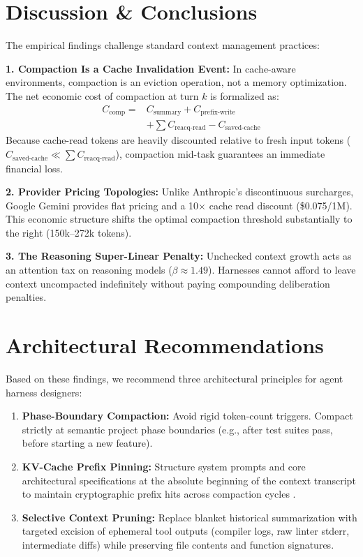 \documentclass[10pt,twocolumn,a4paper]{article}
\begin{document}
\section{Discussion \& Conclusions}

The empirical findings challenge standard context management practices:

\textbf{1. Compaction Is a Cache Invalidation Event:} In cache-aware environments, compaction is an eviction operation, not a memory optimization. The net economic cost of compaction at turn $k$ is formalized as:
\begin{align}
C_{\text{comp}} ={} & C_{\text{summary}} + C_{\text{prefix-write}} \nonumber \\
& + \sum C_{\text{reacq-read}} - C_{\text{saved-cache}}
\end{align}
Because cache-read tokens are heavily discounted relative to fresh input tokens ($C_{\text{saved-cache}} \ll \sum C_{\text{reacq-read}}$), compaction mid-task guarantees an immediate financial loss.

\textbf{2. Provider Pricing Topologies:} Unlike Anthropic's discontinuous surcharges, Google Gemini provides flat pricing and a 10$\times$ cache read discount (\$0.075/1M). This economic structure shifts the optimal compaction threshold substantially to the right (150k--272k tokens).

\textbf{3. The Reasoning Super-Linear Penalty:} Unchecked context growth acts as an attention tax on reasoning models ($\beta \approx 1.49$). Harnesses cannot afford to leave context uncompacted indefinitely without paying compounding deliberation penalties.

\section{Architectural Recommendations}

Based on these findings, we recommend three architectural principles for agent harness designers:
\begin{enumerate}
  \item \textbf{Phase-Boundary Compaction:} Avoid rigid token-count triggers. Compact strictly at semantic project phase boundaries (e.g., after test suites pass, before starting a new feature).
  \item \textbf{KV-Cache Prefix Pinning:} Structure system prompts and core architectural specifications at the absolute beginning of the context transcript to maintain cryptographic prefix hits across compaction cycles \cite{gim2024promptcache}.
  \item \textbf{Selective Context Pruning:} Replace blanket historical summarization with targeted excision of ephemeral tool outputs (compiler logs, raw linter stderr, intermediate diffs) while preserving file contents and function signatures.
\end{enumerate}
\end{document}
